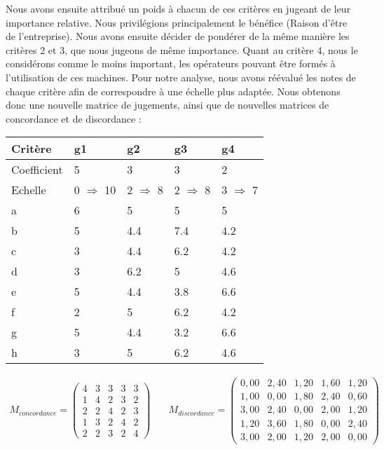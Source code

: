 \documentclass[12pt]{article}
\begin{document}
Nous avons ensuite attribué un poids à chacun de ces critères en jugeant de leur importance relative. Nous privilégions principalement le bénéfice (Raison d'être de l'entreprise). Nous avons ensuite décider de pondérer de la même manière les critères 2 et 3, que nous jugeons de même importance. Quant au critère 4, nous le considérons comme le moins important, les opérateurs pouvant être formés à l'utilisation de ces machines.
Pour notre analyse, nous avons réévalué les notes de chaque critère afin de correspondre à une échelle plus adaptée. Nous obtenons donc une nouvelle matrice de jugements, ainsi que de nouvelles matrices de concordance et de discordance :
\begin{center}
\renewcommand{\arraystretch}{1.2}
\begin{tabular}{|L|M|M|M|M|}
\hline 
Critère & g1 & g2 & g3 & g4 \\\hline  
Coefficient & 5 & 3 & 3 & 2 \\ \hline 
Echelle & 0 $ \Rightarrow $ 10 & 2 $ \Rightarrow $ 8 & 2 $ \Rightarrow $ 8 & 3 $ \Rightarrow $ 7 \\ \hline 
a & 6 & 5 & 5 & 5 \\ \hline 
b & 5 & 4.4 & 7.4 & 4.2 \\ \hline 
c & 3 & 4.4 & 6.2 & 4.2 \\ \hline 
d & 3 & 6.2 & 5 & 4.6 \\ \hline 
e & 5 & 4.4 & 3.8 & 6.6 \\ \hline 
f & 2 & 5 & 6.2 & 4.2 \\ \hline 
g & 5 & 4.4 & 3.2 & 6.6 \\ \hline 
h & 3 & 5 & 6.2 & 4.6 \\ 
\hline 
\end{tabular} 
\end{center}
\begin{align*}
M_{concordance} =
 \begin{pmatrix}
  4	&3	&3	&3	&3\\
1	&4	&2	&3	&2\\
2	&2	&4	&2	&3\\
1	&3	&2	&4	&2\\
2	&2	&3	&2	&4
 \end{pmatrix}& \quad
 M_{discordance} =
 \begin{pmatrix}
 0,00	&2,40 &1,20 &1,60 &1,20\\
 1,00   &0,00 &1,80	&2,40 &0,60\\
 3,00	&2,40 &0,00 &2,00 &1,20\\
 1,20	&3,60	&1,80 &0,00	&2,40\\
 3,00	&2,00	&1,20  &2,00  &0,00
 \end{pmatrix}
\end{align*}
\end{document}
